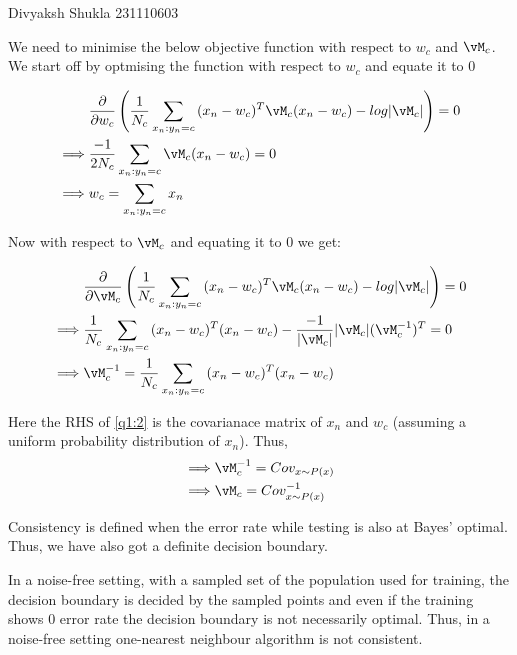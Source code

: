 \documentclass[a4paper,11pt]{article}
\begin{document}
{Divyaksh Shukla}   %
{231110603}	%

\begin{mlsolution}

We need to minimise the below objective function with respect to $w_c$ and $\vM_c$. We start off by optmising the function with respect to $w_c$ and equate it to $0$

\begin{align}
& \frac{\partial}{\partial w_c} \left(\frac{1}{N_c}\sum_{x_n:y_n = c}{(x_n - w_c)^T\vM_c(x_n - w_c)} - log|\vM_c|\right) = 0\nonumber\\
\implies & \frac{-1}{2N_c}\sum_{x_n:y_n = c}{\vM_c(x_n - w_c)} = 0\nonumber\\
\implies & w_c = \sum_{x_n:y_n = c}{x_n}
\end{align}

Now with respect to $\vM_c$ and equating it to $0$ we get:

\begin{align}
& \frac{\partial}{\partial \vM_c} \left(\frac{1}{N_c}\sum_{x_n:y_n = c}{(x_n - w_c)^T\vM_c(x_n - w_c)} - log|\vM_c|\right) = 0\nonumber\\
\implies & \frac{1}{N_c}\sum_{x_n:y_n = c}{(x_n - w_c)^T(x_n - w_c)} - \frac{-1}{|\vM_c|}{|\vM_c|}(\vM_c^{-1})^T = 0\nonumber\\
\implies & \vM_c^{-1} = \frac{1}{N_c}\sum_{x_n:y_n = c}{(x_n - w_c)^T(x_n - w_c)}\label{q1:2}
\end{align}

Here the RHS of \ref{q1:2} is the covarianace matrix of $x_n$ and $w_c$ (assuming a uniform probability distribution of $x_n$). Thus, 
\begin{align}
    \implies & \vM_c^{-1} = Cov_{x\sim P(x)}\nonumber\\
    \implies & \vM_c = Cov_{x\sim P(x)}^{-1}
\end{align}







\end{mlsolution}

\begin{mlsolution} 

Consistency is defined when the error rate while testing is also at Bayes' optimal. Thus, we have also got a definite decision boundary.

In a noise-free setting, with a sampled set of the population used for training, the decision boundary is decided by the sampled points and even if the training shows 0 error rate the decision boundary is not necessarily optimal. Thus, in a noise-free setting one-nearest neighbour algorithm is not consistent.


\end{mlsolution}
\end{document}
